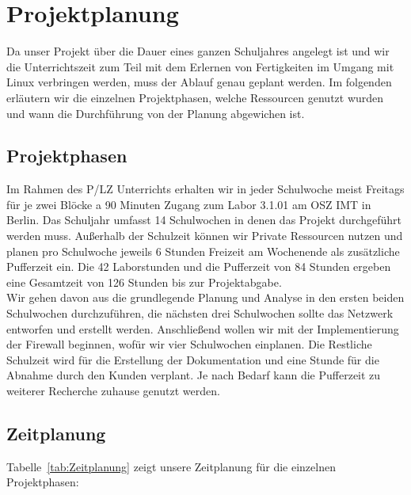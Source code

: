 \section{Projektplanung} 
\label{sec:Projektplanung}

Da unser Projekt über die Dauer eines ganzen Schuljahres angelegt ist und wir die Unterrichtszeit zum Teil mit dem Erlernen von Fertigkeiten im Umgang mit Linux verbringen werden, muss der Ablauf genau geplant werden. Im folgenden erläutern wir die einzelnen Projektphasen, welche Ressourcen genutzt wurden und wann die Durchführung von der Planung abgewichen ist.

\subsection{Projektphasen}
\label{sec:Projektphasen}

    Im Rahmen des P/LZ Unterrichts erhalten wir in jeder Schulwoche meist Freitags für je zwei Blöcke a 90 Minuten Zugang zum Labor 3.1.01 am OSZ IMT in Berlin. Das Schuljahr umfasst 14 Schulwochen in denen das Projekt durchgeführt werden muss. Außerhalb der Schulzeit können wir Private Ressourcen nutzen und planen pro Schulwoche jeweils 6 Stunden Freizeit am Wochenende als zusätzliche Pufferzeit ein. Die 42 Laborstunden und die Pufferzeit von 84 Stunden ergeben eine Gesamtzeit von 126 Stunden bis zur Projektabgabe.\\
    Wir gehen davon aus die grundlegende Planung und Analyse in den ersten beiden Schulwochen durchzuführen, die nächsten drei Schulwochen sollte das Netzwerk entworfen und erstellt werden. Anschließend wollen wir mit der Implementierung der Firewall beginnen, wofür wir \ca vier Schulwochen einplanen. Die Restliche Schulzeit wird für die Erstellung der Dokumentation und eine Stunde für die Abnahme durch den Kunden verplant. Je nach Bedarf kann die Pufferzeit zu weiterer Recherche zuhause genutzt werden.

\subsection{Zeitplanung}
\label{sec:Zeitplanung}

Tabelle~\ref{tab:Zeitplanung} zeigt unsere Zeitplanung für die einzelnen Projektphasen:


